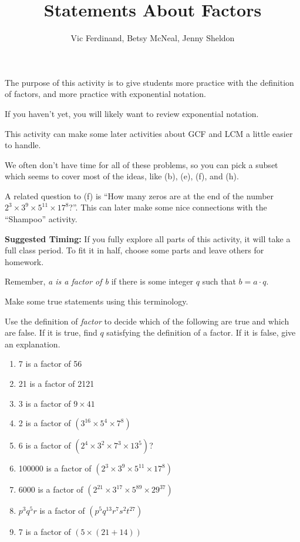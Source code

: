 \documentclass{ximera}
\title{Statements About Factors}
\author{Vic Ferdinand, Betsy McNeal, Jenny Sheldon}
\begin{document}
\begin{abstract} \end{abstract}
\maketitle

\begin{instructorIntro}
The purpose of this activity is to give students more practice with the definition of factors, and more practice with exponential notation.

If you haven't yet, you will likely want to review exponential notation.

This activity can make some later activities about GCF and LCM a little easier to handle.

We often don't have time for all of these problems, so you can pick a subset which seems to cover most of the ideas, like (b), (e), (f), and (h).

A related question to (f) is ``How many zeros are at the end of the number $2^3\times 3^9\times 5^{11} \times 17^8$?''.  This can later make some nice connections with the ``Shampoo'' activity.

{\bf Suggested Timing:} If you fully explore all parts of this activity, it will take a full class period.  To fit it in half, choose some parts and leave others for homework.
\end{instructorIntro}


Remember, \emph{a is a factor of b} if there is some integer $q$ such that $b = a \cdot q$.
\begin{problem}
 Make some true statements using this terminology.
\end{problem}

\begin{problem}
Use the definition of \emph{factor} to decide which of the following are true and which are false. If it is true, find $q$ satisfying the definition of a factor. If it is false, give an explanation.

\begin{enumerate}
\item 7 is a factor of 56 
\item 21 is a factor of 2121
\item 3 is a factor of $9 \times 41$
\item 2 is a factor of $(3^{16} \times 5^4 \times 7^8)$
\item 6 is a factor of $(2^4 \times 3^2 \times 7^3 \times 13^5)$?\item 100000 is a factor of  $(2^3 \times 3^9 \times 5^{11} \times17^8)$
\item 6000  is a factor of  $(2^{21} \times 3^{17} \times 5^{89} \times 29^{37})$
\item $p^3q^5r$  is a factor of $(p^5q^{13}r^7s^2t^{27}) $
\item 7 is a factor of $(5 \times (21+14))$
\end{enumerate}
\end{problem}
\end{document}
